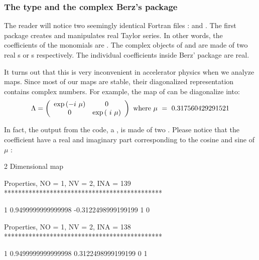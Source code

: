 \documentclass[english,12pt,article]{article} %
\begin{document}
{\subsubsection{The type {} and the complex Berz's package }\label{sec:cdamap}
  
  The reader will notice two seemingly identical Fortran files :  and  . The first package creates and manipulates real Taylor series. In other words, the coefficients of the monomials are . 
  The complex objects of  and   are made of two real  s  or  s  respectively. The individual coefficients inside Berz' package  are real.
  
  It turns out that this is very inconvenient in accelerator physics  when we analyze maps. Since most of our maps are stable, their diagonalized representation contains complex numbers. For example, the map  of  can be diagonalize 
  into:
%
\begin{align} \Lambda =
\left({\begin{array}{cc}\exp\left({-i\ \mu }\right)&0\\
0&\exp\left({\ i\ \mu }\right)\end{array}}\right)~{\rm w}{\rm h}{\rm e}{\rm r}{\rm e}~\mu \ =
\ 0.317560429291521 \label{eq:lam}\end{align}

In fact, the output  from the code, a ,   is made of two . Please notice that the coefficient have a real and imaginary part  corresponding to the cosine and sine of $\mu$ :

\begin{example}
           2  Dimensional map

 Properties, NO =    1, NV =    2, INA =  139
 *********************************************

   1  0.9499999999999998     -0.3122498999199199       1  0


 Properties, NO =    1, NV =    2, INA =  138
 *********************************************

   1  0.9499999999999998      0.3122498999199199       0  1


\end{example}}
\end{document}
